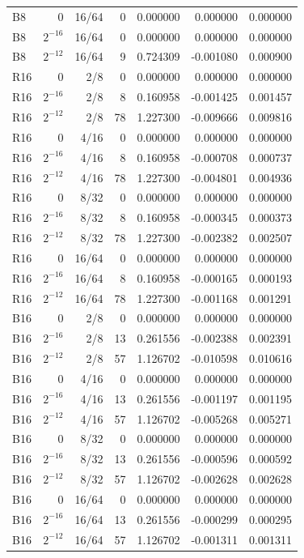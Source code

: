 {\begin{longtable}{lrrrrrr}
B8 & $0$ & 16/64 & 0 & 0.000000 & 0.000000 & 0.000000 \\
B8 & $2^{-16}$ & 16/64 & 0 & 0.000000 & 0.000000 & 0.000000 \\
B8 & $2^{-12}$ & 16/64 & 9 & 0.724309 & -0.001080 & 0.000900 \\
R16 & $0$ & 2/8 & 0 & 0.000000 & 0.000000 & 0.000000 \\
R16 & $2^{-16}$ & 2/8 & 8 & 0.160958 & -0.001425 & 0.001457 \\
R16 & $2^{-12}$ & 2/8 & 78 & 1.227300 & -0.009666 & 0.009816 \\
R16 & $0$ & 4/16 & 0 & 0.000000 & 0.000000 & 0.000000 \\
R16 & $2^{-16}$ & 4/16 & 8 & 0.160958 & -0.000708 & 0.000737 \\
R16 & $2^{-12}$ & 4/16 & 78 & 1.227300 & -0.004801 & 0.004936 \\
R16 & $0$ & 8/32 & 0 & 0.000000 & 0.000000 & 0.000000 \\
R16 & $2^{-16}$ & 8/32 & 8 & 0.160958 & -0.000345 & 0.000373 \\
R16 & $2^{-12}$ & 8/32 & 78 & 1.227300 & -0.002382 & 0.002507 \\
R16 & $0$ & 16/64 & 0 & 0.000000 & 0.000000 & 0.000000 \\
R16 & $2^{-16}$ & 16/64 & 8 & 0.160958 & -0.000165 & 0.000193 \\
R16 & $2^{-12}$ & 16/64 & 78 & 1.227300 & -0.001168 & 0.001291 \\
B16 & $0$ & 2/8 & 0 & 0.000000 & 0.000000 & 0.000000 \\
B16 & $2^{-16}$ & 2/8 & 13 & 0.261556 & -0.002388 & 0.002391 \\
B16 & $2^{-12}$ & 2/8 & 57 & 1.126702 & -0.010598 & 0.010616 \\
B16 & $0$ & 4/16 & 0 & 0.000000 & 0.000000 & 0.000000 \\
B16 & $2^{-16}$ & 4/16 & 13 & 0.261556 & -0.001197 & 0.001195 \\
B16 & $2^{-12}$ & 4/16 & 57 & 1.126702 & -0.005268 & 0.005271 \\
B16 & $0$ & 8/32 & 0 & 0.000000 & 0.000000 & 0.000000 \\
B16 & $2^{-16}$ & 8/32 & 13 & 0.261556 & -0.000596 & 0.000592 \\
B16 & $2^{-12}$ & 8/32 & 57 & 1.126702 & -0.002628 & 0.002628 \\
B16 & $0$ & 16/64 & 0 & 0.000000 & 0.000000 & 0.000000 \\
B16 & $2^{-16}$ & 16/64 & 13 & 0.261556 & -0.000299 & 0.000295 \\
B16 & $2^{-12}$ & 16/64 & 57 & 1.126702 & -0.001311 & 0.001311 \\
\hline\end{longtable}}

